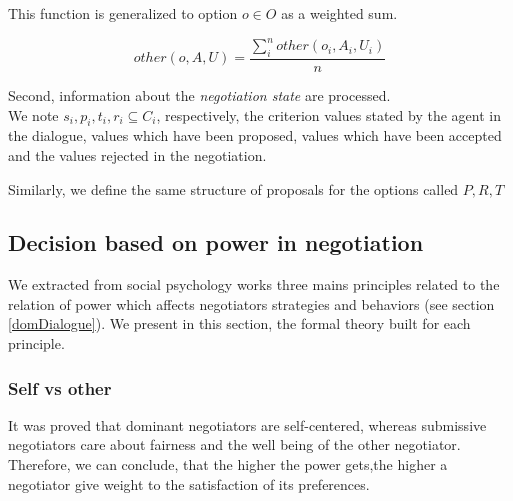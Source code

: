 \documentclass{article}
\begin{document}
	This function is generalized to option $o \in O$ as a weighted sum.
	
	\begin{equation}
	other(o, A, U) = \frac{ \sum_{i}^{n} other(o_i, A_i, U_i) } {n}
	\end{equation}
	
	Second, information about the \textit{negotiation state} are processed. \\
	We note  $s_i, p_i, t_i, r_i \subseteq C_i$, respectively, the criterion values stated by the agent in the dialogue, values which have been proposed, values which have been accepted and the values rejected in the negotiation. 
		
	Similarly, we define the same structure of proposals for the options called $P, R, T$
	
	\subsection{Decision based on power in negotiation}
	\label{decision}
	We extracted from social psychology works three mains principles related to the relation of power which affects negotiators strategies and behaviors (see section \ref{domDialogue}). We present in this section, the formal theory built for each principle. 
	
	\subsubsection {Self vs other}
		It was proved that dominant negotiators are self-centered, whereas submissive negotiators care about fairness and the well being of the other negotiator. Therefore, we can conclude, that the higher the power gets,the higher a negotiator give weight to the satisfaction of its preferences.
	
\end{document}
